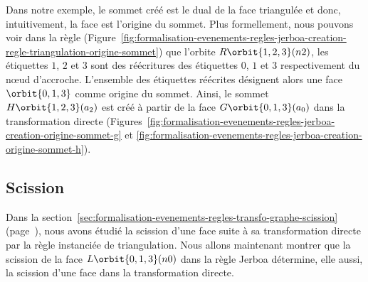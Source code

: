 Dans notre exemple, le sommet créé est le dual de la face triangulée et donc,
intuitivement, la face est l'origine du sommet. %
Plus formellement, nous pouvons voir dans la règle
(Figure~\ref{fig:formalisation-evenements-regles-jerboa-creation-regle-triangulation-origine-sommet})
que l'orbite \(R\orbit{1,2,3}(n2)\), les étiquettes \(1\), \(2\) et \(3\) sont
des réécritures des étiquettes \(0\), \(1\) et \(3\) respectivement du n\oe ud
d'accroche. %
L'ensemble des étiquettes réécrites désignent alors une face \(\orbit{0,1,3}\)
comme origine du sommet. %
Ainsi, le sommet \(H\orbit{1,2,3}(a_{2})\) est créé à partir de la face
\(G\orbit{0,1,3}(a_{0})\) dans la transformation directe
(Figures~\ref{fig:formalisation-evenements-regles-jerboa-creation-origine-sommet-g}
et \ref{fig:formalisation-evenements-regles-jerboa-creation-origine-sommet-h}). %

\subsection{Scission}

Dans la
section~\ref{sec:formalisation-evenements-regles-transfo-graphe-scission} (page~\pageref{sec:formalisation-evenements-regles-transfo-graphe-scission}), nous avons étudié la scission d'une face suite à sa transformation directe par la règle instanciée de triangulation. %
Nous allons maintenant montrer que la scission de la face \(L\orbit{0,1,3}(n0)\)
dans la règle Jerboa détermine, elle aussi, la scission d'une face dans la
transformation directe. %

